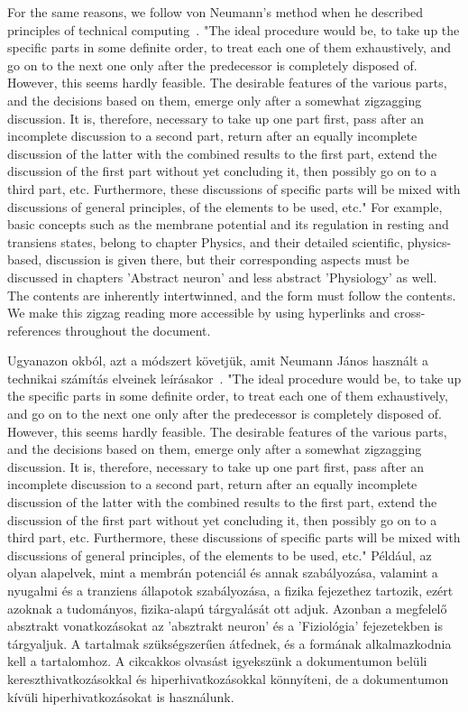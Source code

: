 For the same reasons, we follow von Neumann's method when he described principles of technical computing~\cite{EDVACreport1945}. "The ideal procedure would be, to take up the specific parts in some definite order, to treat
each one of them exhaustively, and go on to the next one only after the predecessor is completely
disposed of. However, this seems hardly feasible. The desirable features of the various parts, and
the decisions based on them, emerge only after a somewhat \hypertarget{zigzagdiscussion}
{zigzagging discussion}. It is, therefore,
necessary to take up one part first, pass after an incomplete discussion to a second part, return after
an equally incomplete discussion of the latter with the combined results to the first part, extend
the discussion of the first part without yet concluding it, then possibly go on to a third part, etc.
Furthermore, these discussions of specific parts will be mixed with discussions of general principles, of the elements to be used, etc."
For example, basic concepts such as the membrane potential and its regulation in resting and transiens states, belong to chapter Physics,
and their detailed scientific, physics-based, discussion is given there, 
but their corresponding aspects must be discussed in chapters 'Abstract neuron' and less abstract 'Physiology' as well.
The contents are inherently intertwinned, and the form must follow the contents.
We make this zigzag reading more accessible by using hyperlinks and cross-references throughout the document. 

\else

Ugyanazon okból, azt a módszert követjük, amit Neumann János
használt a technikai számítás elveinek leírásakor~\cite{EDVACreport1945}. "The ideal procedure would be, to take up the specific parts in some definite order, to treat
each one of them exhaustively, and go on to the next one only after the predecessor is completely
disposed of. However, this seems hardly feasible. The desirable features of the various parts, and
the decisions based on them, emerge only after a somewhat \hypertarget{zigzagdiscussion}
{zigzagging discussion}. It is, therefore,
necessary to take up one part first, pass after an incomplete discussion to a second part, return after
an equally incomplete discussion of the latter with the combined results to the first part, extend
the discussion of the first part without yet concluding it, then possibly go on to a third part, etc.
Furthermore, these discussions of specific parts will be mixed with discussions of general principles, of the elements to be used, etc."
Például, az olyan alapelvek, mint a membrán potenciál és annak
szabályozása, valamint a nyugalmi és a tranziens állapotok szabályozása,  a fizika fejezethez tartozik, ezért azoknak a tudományos, fizika-alapú 
tárgyalását ott adjuk. Azonban a megfelelő absztrakt vonatkozásokat 
az 'absztrakt neuron' és a 'Fiziológia' fejezetekben is tárgyaljuk.
A tartalmak szükségszerűen átfednek, és a formának alkalmazkodnia
kell a tartalomhoz.
A cikcakkos olvasást igyekszünk a dokumentumon belüli
kereszthivatkozásokkal és hiperhivatkozásokkal könnyíteni,
de a dokumentumon kívüli hiperhivatkozásokat is használunk.
\fi


